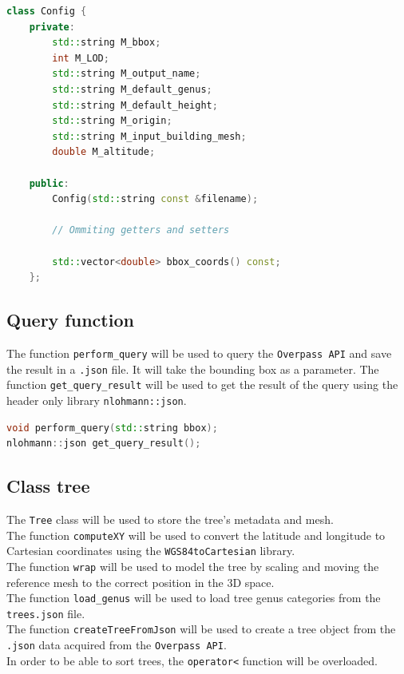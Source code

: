 \documentclass[12pt]{article}
\begin{document}
\begin{lstlisting}[language=C++]
class Config {
    private:
        std::string M_bbox;
        int M_LOD;
        std::string M_output_name;
        std::string M_default_genus;
        std::string M_default_height;
        std::string M_origin;
        std::string M_input_building_mesh;
        double M_altitude;

    public:
        Config(std::string const &filename);

        // Ommiting getters and setters

        std::vector<double> bbox_coords() const;
    };

\end{lstlisting}

\subsection{Query function}

The function \texttt{perform\_query} will be used to query the \texttt{Overpass API}
and save the result in a \texttt{.json} file. It will take the bounding box as a
parameter.
The function \texttt{get\_query\_result} will be used to get the result of the query
using the header only library \texttt{nlohmann::json}.

\begin{lstlisting}[language=C++]
void perform_query(std::string bbox);
nlohmann::json get_query_result();
\end{lstlisting}

\subsection{Class tree}

The \texttt{Tree} class will be used to store the tree's metadata and mesh. \\
The function \texttt{computeXY} will be used to convert the latitude and longitude
to Cartesian coordinates using the \texttt{WGS84toCartesian} library. \\
The function \texttt{wrap} will be used to model the tree by scaling and moving
the reference mesh to the correct position in the 3D space. \\
The function \texttt{load\_genus} will be used to load tree genus categories from
the \texttt{trees.json} file. \\
The function \texttt{createTreeFromJson} will be used to create a tree object from
the \texttt{.json} data acquired from the \texttt{Overpass API}. \\
In order to be able to sort trees, the \texttt{operator<} function will be overloaded.
\end{document}
